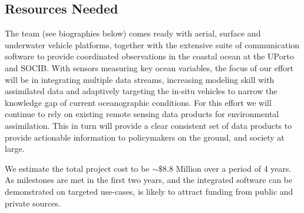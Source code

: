 \subsection{Resources Needed}

The \pro team (see biographies below) comes ready with aerial, surface
and underwater vehicle platforms, together with the extensive suite of
communication software to provide coordinated observations in the
coastal ocean at the UPorto and SOCIB. With sensors measuring key
ocean variables, the focus of our effort will be in integrating
multiple data streams, increasing modeling skill with assimilated data
and adaptively targeting the in-situ vehicles to narrow the knowledge
gap of current oceanographic conditions. For this effort we will
continue to rely on existing remote sensing data products for
environmental assimilation. This in turn will provide a clear
consistent set of data products to provide actionable information to
policymakers on the ground, and society at large.


We estimate the total project cost to be $\sim\$8.8$ Million over a
period of 4 years. As milestones are met in the first two years, and
the integrated software can be demonstrated on targeted use-cases,
\pro is likely to attract funding from public and private
sources. %




